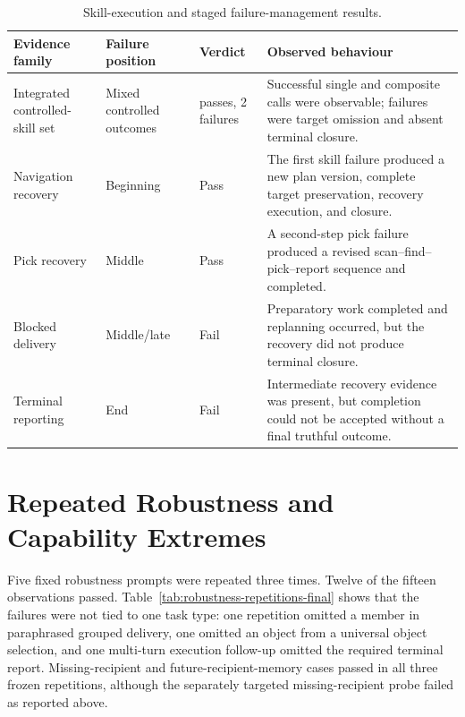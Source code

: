 \begin{table}[H]
\centering
\small
\renewcommand{\arraystretch}{1.12}
\caption{Skill-execution and staged failure-management results.}
\label{tab:skill-failure-results}
\begin{tabularx}{\textwidth}{@{}>{\RaggedRight\arraybackslash}p{}>{\RaggedRight\arraybackslash}p{}>{\RaggedRight\arraybackslash}p{}>{\RaggedRight\arraybackslash}X@{}}
\toprule
\textbf{Evidence family} & \textbf{Failure position} & \textbf{Verdict} & \textbf{Observed behaviour}\\
\midrule
Integrated controlled-skill set & Mixed controlled outcomes & 7 passes, 2 failures & Successful single and composite calls were observable; failures were target omission and absent terminal closure.\\
Navigation recovery & Beginning & Pass & The first skill failure produced a new plan version, complete target preservation, recovery execution, and closure.\\
Pick recovery & Middle & Pass & A second-step pick failure produced a revised scan--find--pick--report sequence and completed.\\
Blocked delivery & Middle/late & Fail & Preparatory work completed and replanning occurred, but the recovery did not produce terminal closure.\\
Terminal reporting & End & Fail & Intermediate recovery evidence was present, but completion could not be accepted without a final truthful outcome.\\
\bottomrule
\end{tabularx}
\end{table}

\section{Repeated Robustness and Capability Extremes}

Five fixed robustness prompts were repeated three times. Twelve of the fifteen observations passed. Table~\ref{tab:robustness-repetitions-final} shows that the failures were not tied to one task type: one repetition omitted a member in paraphrased grouped delivery, one omitted an object from a universal object selection, and one multi-turn execution follow-up omitted the required terminal report. Missing-recipient and future-recipient-memory cases passed in all three frozen repetitions, although the separately targeted missing-recipient probe failed as reported above.

